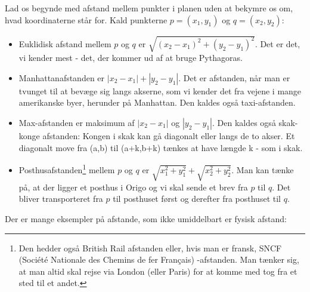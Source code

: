 \documentclass[a4paper, 12pt]{article}
\theoremstyle{remark}
\begin{document}
Lad os begynde med afstand mellem punkter i planen uden at bekymre os om, hvad koordinaterne står for. Kald punkterne $p=(x_1,y_1)$ og $q=(x_2,y_2)$: 
\begin{itemize}
\item Euklidisk afstand mellem $p$ og $q$ er $\sqrt{(x_2-x_1)^2+(y_2-y_1)^2}$. Det er det, vi kender mest - det, der kommer ud af at bruge Pythagoras.
\item Manhattanafstanden er $|x_2-x_1|+|y_2-y_1|$. Det er afstanden, når man er tvunget til at bevæge sig langs akserne, som vi kender det fra vejene i mange amerikanske byer, herunder på Manhattan. Den kaldes også taxi-afstanden. 
\item Max-afstanden er maksimum af   $|x_2-x_1|$ og $|y_2-y_1|$. Den kaldes også skak-konge afstanden: Kongen i skak kan gå diagonalt eller langs de to akser. Et diagonalt move fra (a,b) til (a+k,b+k) tænkes at have længde k - som i skak. 
\item Posthusafstanden\footnote{Den hedder også British Rail afstanden eller, hvis man er fransk, SNCF (Société Nationale des Chemins de fer Fran\c{c}ais) -afstanden. Man tænker sig, at man altid skal rejse via London (eller Paris) for at komme med tog fra et sted til et andet.} mellem $p$ og $q$ er $\sqrt{x_1^2+y_1^2}+\sqrt{x_2^2+y_2^2}$. Man kan tænke på, at der ligger et posthus i Origo og vi skal sende et brev fra $p$ til $q$. Det bliver transporteret fra $p$  til posthuset først og derefter fra posthuset til $q$.
\end{itemize}
Der er mange eksempler på afstande, som ikke umiddelbart er fysisk afstand:
\end{document}
